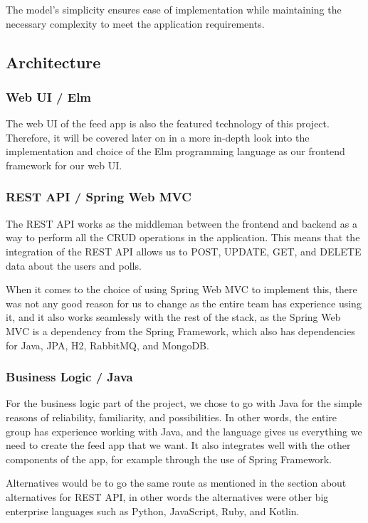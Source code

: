 The model's simplicity ensures ease of implementation while maintaining the necessary complexity to meet the application requirements.

\subsection{Architecture}

\subsubsection{Web UI / Elm}
The web UI of the feed app is also the featured technology of this project. Therefore, it will be covered later on in a more in-depth look into the implementation and choice of the Elm programming language as our frontend framework for our web UI.

\subsubsection{REST API / Spring Web MVC}
The REST API works as the middleman between the frontend and backend as a way to perform all the CRUD operations in the application. This means that the integration of the REST API allows us to POST, UPDATE, GET, and DELETE data about the users and polls.

When it comes to the choice of using Spring Web MVC to implement this, there was not any good reason for us to change as the entire team has experience using it, and it also works seamlessly with the rest of the stack, as the Spring Web MVC is a dependency from the Spring Framework, which also has dependencies for Java, JPA, H2, RabbitMQ, and MongoDB. 

\subsubsection{Business Logic / Java}
For the business logic part of the project, we chose to go with Java for the simple reasons of reliability, familiarity, and possibilities. In other words, the entire group has experience working with Java, and the language gives us everything we need to create the feed app that we want. It also integrates well with the other components of the app, for example through the use of Spring Framework.

Alternatives would be to go the same route as mentioned in the section about alternatives for REST API, in other words the alternatives were other big enterprise languages such as Python, JavaScript, Ruby, and Kotlin. 

